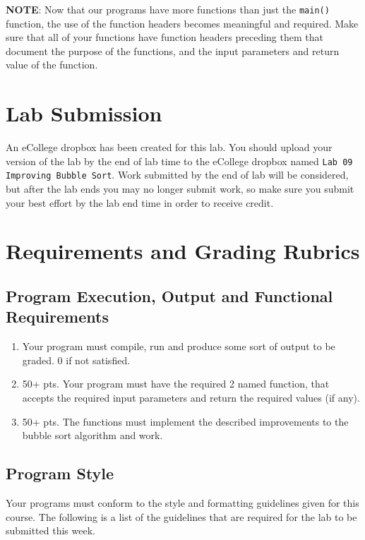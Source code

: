 \documentclass[11pt]{article}
\begin{document}
\textbf{NOTE}: Now that our programs have more functions than just the
\verb~main()~ function, the use of the function headers becomes meaningful
and required.  Make sure that all of your functions have function
headers preceding them that document the purpose of the functions, and
the input parameters and return value of the function.
\section*{Lab Submission}
\label{sec-4}

An eCollege dropbox has been created for this lab.  You should upload
your version of the lab by the end of lab time to the eCollege dropbox
named \verb~Lab 09 Improving Bubble Sort~.  Work submitted by the end of
lab will be considered, but after the lab ends you may no longer
submit work, so make sure you submit your best effort by the lab end
time in order to receive credit.
\section*{Requirements and Grading Rubrics}
\label{sec-5}

\subsection*{Program Execution, Output and Functional Requirements}
\label{sec-5-1}

\begin{enumerate}
\item Your program must compile, run and produce some sort of output to be
graded. 0 if not satisfied.
\item 50+ pts.  Your program must have the required 2 named function,
that accepts the required input parameters and return the required
values (if any).
\item 50+ pts. The functions must implement the described improvements
to the bubble sort algorithm and work.
\end{enumerate}

\subsection*{Program Style}
\label{sec-5-2}

Your programs must conform to the style and formatting guidelines given for this course.
The following is a list of the guidelines that are required for the lab to be submitted
this week.
\end{document}
